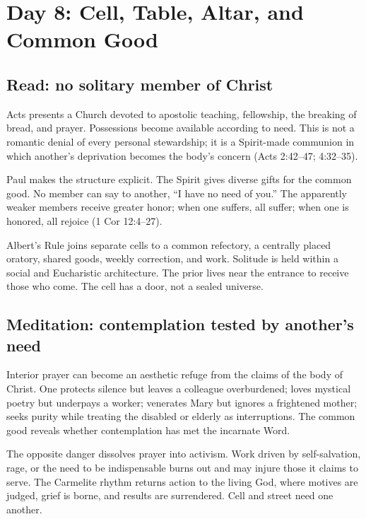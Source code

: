 \section{Day 8: Cell, Table, Altar, and Common Good}


\subsection{Read: no solitary member of Christ}

Acts presents a Church devoted to apostolic teaching, fellowship, the breaking of bread, and prayer. Possessions become available according to need. This is not a romantic denial of every personal stewardship; it is a Spirit-made communion in which another's deprivation becomes the body's concern (Acts 2:42--47; 4:32--35).

Paul makes the structure explicit. The Spirit gives diverse gifts for the common good. No member can say to another, ``I have no need of you.'' The apparently weaker members receive greater honor; when one suffers, all suffer; when one is honored, all rejoice (1 Cor 12:4--27).

Albert's Rule joins separate cells to a common refectory, a centrally placed oratory, shared goods, weekly correction, and work. Solitude is held within a social and Eucharistic architecture. The prior lives near the entrance to receive those who come. The cell has a door, not a sealed universe.

\subsection{Meditation: contemplation tested by another's need}

Interior prayer can become an aesthetic refuge from the claims of the body of Christ. One protects silence but leaves a colleague overburdened; loves mystical poetry but underpays a worker; venerates Mary but ignores a frightened mother; seeks purity while treating the disabled or elderly as interruptions. The common good reveals whether contemplation has met the incarnate Word.

The opposite danger dissolves prayer into activism. Work driven by self-salvation, rage, or the need to be indispensable burns out and may injure those it claims to serve. The Carmelite rhythm returns action to the living God, where motives are judged, grief is borne, and results are surrendered. Cell and street need one another.

